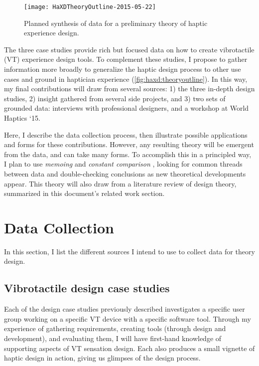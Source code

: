 \begin{figure}[h] %
   \centering
   \texttt{[image: HaXDTheoryOutline-2015-05-22]} 
   \caption{Planned synthesis of data for a preliminary theory of haptic experience design.}
   \label{fig:haxd:theoryoutline}
\end{figure}


The three case studies provide rich but focused data on how to create vibrotactile (VT) experience design tools.
To complement these studies, I propose to gather information more broadly to generalize the haptic design process to other use cases and ground in haptician experience (\autoref{fig:haxd:theoryoutline}).
In this way, my final contributions will draw from several sources: 
1) the three in-depth design studies,
2) insight gathered from several side projects, and
3) two sets of grounded data: interviews with professional designers, and
a workshop at World Haptics `15.

Here, I describe the data collection process, then illustrate possible applications and forms for these contributions.
However, any resulting theory will be emergent from the data, and can take many forms.
To accomplish this in a principled way, I plan to use \emph{memoing} and \emph{constant comparison} \cite{Corbin2008}, looking for common threads between data and double-checking conclusions as new theoretical developments appear.
This theory will also draw from a literature review of design theory, summarized in this document's related work section.




%
%
\section{Data Collection}
In this section, I list the different sources I intend to use to collect data for theory design.

\subsection{Vibrotactile design case studies}
Each of the  design case studies previously described investigates a specific user group working on a specific VT device with a specific software tool.
Through my experience of gathering requirements, creating tools (through design and development), and evaluating them, I will have first-hand knowledge of supporting aspects of VT sensation design.
Each also produces a small vignette of haptic design in action, giving us glimpses of the design process.

